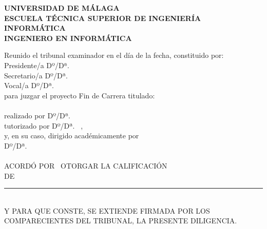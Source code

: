 \begin{center}
\bfseries
UNIVERSIDAD DE MÁLAGA
\\
ESCUELA TÉCNICA SUPERIOR DE INGENIERÍA INFORMÁTICA
\\
\medskip
\mdseries
INGENIERO EN INFORMÁTICA
\end{center}
Reunido el tribunal examinador en el día de la fecha, constituido por:
\\
\medskip
Presidente/a Dº/Dª. \hrulefill
\\
\medskip
Secretario/a Dº/Dª. \hrulefill
\\
\medskip
Vocal/a Dº/Dª. \hrulefill
\\
\medskip
para juzgar el proyecto Fin de Carrera titulado: \hrulefill
\\
\medskip
\hrulefill
\\
\medskip
realizado por Dº/Dª. \hrulefill
\\
\medskip
tutorizado por Dº/Dª. \hrulefill \ ,
\\
\medskip
y, en su caso, dirigido académicamente por
\\
\medskip
Dº/Dª. \hrulefill
\\
\medskip
\hrulefill
\\
\medskip
ACORDÓ POR \hrulefill  \ OTORGAR LA CALIFICACIÓN
\\
\medskip
DE \rule{8cm}{0.5pt} %
\\
\medskip
Y PARA QUE CONSTE, SE EXTIENDE FIRMADA POR LOS COMPARECIENTES DEL TRIBUNAL, LA PRESENTE DILIGENCIA.
\\
\medskip
{}

